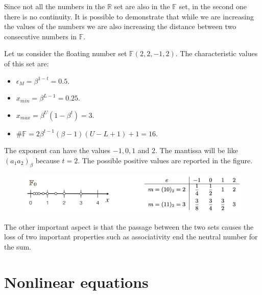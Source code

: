 \documentclass[12pt, a4paper]{report}
\theoremstyle{remark}
\begin{document}
Since not all the numbers in the $\mathbb{R}$ set are also in the $\mathbb{F}$ set, in the second one there is no continuity. It is possible to 
demonstrate that while we are increasing the values of the numbers we are also increasing the distance between two consecutive numbers in $\mathbb{F}$.
\begin{example}
    Let us consider the floating number set $\mathbb{F}(2,2,-1,2)$. The characteristic values of this set are: 
    \begin{itemize}
        \item $\epsilon_M=\beta^{1-t}=0.5$.
        \item $x_{min}=\beta^{L-1}=0.25$.
        \item $x_{max}=\beta^U(1-\beta^t)=3$.
        \item $\#\mathbb{F}=2 \beta^{t-1}(\beta -1)(U-L+1)+1=16$. 
    \end{itemize}
    The exponent can have the values $-1,0,1$ and $2$. The mantissa will be like $(a_1a_2)_{\beta}$ because $t=2$. The possible positive values are
    reported in the figure. 
    \begin{figure}[H]
        \centering
        \includegraphics[width=0.9\linewidth]{images/numbers.png}
    \end{figure}

\end{example}

The other important aspect is that the passage between the two sets causes the loss of two important properties such as associativity end the 
neutral number for the sum. 

\newpage

\chapter{Nonlinear equations}
\end{document}
